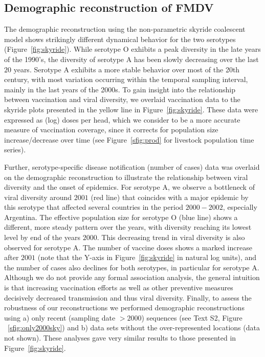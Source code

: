 \documentclass[10pt]{article}
\begin{document}
\subsection*{Demographic reconstruction of FMDV}

The demographic reconstruction using the non-parametric skyride coalescent model shows strikingly different dynamical behavior for the two serotypes (Figure~\ref{fig:skyride}).
While serotype O exhibits a peak diversity in the late years of the 1990's, the diversity of serotype A has been slowly decreasing over the last $20$ years.
Serotype A exhibits a more stable behavior over most of the 20th century, with most variation occurring within the temporal sampling interval, mainly in the last years of the 2000s.
To gain insight into the relationship between vaccination and viral diversity, we overlaid vaccination data to the skyride plots presented in the yellow line in Figure~\ref{fig:skyride}.
These data were expressed as (log) doses per head, which we consider to be a more accurate measure of vaccination coverage, since it corrects for population size increase/decrease over time (see Figure~\ref{sfig:prod} for livestock population time series). 

Further, serotype-specific disease notification (number of cases) data was overlaid on the demographic reconstruction to illustrate the relationship between viral diversity and the onset of epidemics. 
For serotype A, we observe a bottleneck of viral diversity around $2001$ (red line) that coincides with a major epidemic by this serotype that affected several countries in the period $2000-2002$, especially Argentina.
The effective population size for serotype O (blue line) shows a different, more steady pattern over the years, with diversity reaching its lowest level by end of the years $2000$.
This decreasing trend in viral diversity is also observed for serotype A.
The number of vaccine doses shows a marked increase after $2001$ (note that the Y-axis in Figure~\ref{fig:skyride} in natural log units), and the number of cases also declines for both serotypes, in particular for serotype A.
Although we do not provide any formal association analysis, the general intuition is that increasing vaccination efforts as well as other preventive measures decisively decreased transmission and thus viral diversity.
Finally, to assess the robustness of our reconstructions we performed demographic reconstructions using a) only recent (sampling date $>2000$) sequences (see Text S2, Figure ~\ref{sfig:only2000sky}) and b) data sets without the over-represented locations (data not shown).
These analyses gave very similar results to those presented in Figure~\ref{fig:skyride}.
\end{document}
